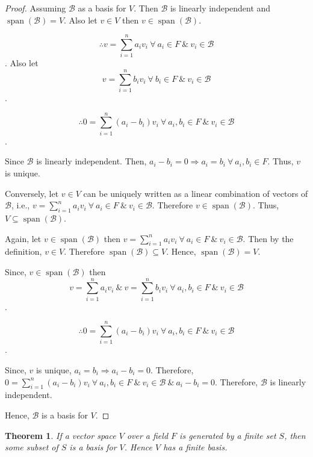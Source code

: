 \documentclass[12pt, a4paper]{article}
\newtheorem{theorem}{Theorem}[section]
\theoremstyle{definition}
\theoremstyle{remark}
\newcommand{\B}{\mathscr{B}}
\DeclareMathOperator{\Span}{span}
\begin{document}
\begin{proof}
    Assuming $\B$ as a basis for $V$. Then $\B$ is linearly independent and $\Span(\B) = V$. Also let $v \in V$ then $v \in \Span(\B)$.

$$\therefore v = \sum_{i=1}^{n} a_i v_i \ \forall \ a_i \in F \ \& \ v_i \in \B$$. Also let $$v = \sum_{i=1}^{n} b_i v_i \ \forall \ b_i \in F \ \& \ v_i \in \B$$.

$$\therefore 0 = \sum_{i=1}^{n} (a_i - b_i) v_i \ \forall \ a_i, b_i \in F \ \& \ v_i \in \B$$.

Since $\B$ is linearly independent. Then, $a_i - b_i = 0 \Rightarrow a_i = b_i \ \forall \ a_i, b_i \in F$. Thus, $v$ is unique.

Conversely, let $v \in V$ can be uniquely written as a linear combination of vectors of $\B$, i.e., $v = \displaystyle\sum_{i=1}^{n} a_i v_i \ \forall \ a_i \in F \ \& \ v_i \in \B$. Therefore $v \in \Span(\B)$. Thus, $V \subseteq \Span(\B)$.

Again, let $v \in \Span(\B)$ then $v = \displaystyle\sum_{i=1}^{n} a_i v_i \ \forall \ a_i \in F \ \& \ v_i \in \B$.
Then by the definition, $v \in V$. Therefore $\Span(\B) \subseteq V$. Hence, $\Span(\B) = V$.

Since, $v \in \Span(\B)$ then $$v = \sum_{i=1}^{n} a_i v_i \ \& \ v = \sum_{i=1}^{n} b_i v_i \ \forall \ a_i, b_i \in F \ \& \ v_i \in \B$$.

$$\therefore 0 = \sum_{i=1}^{n} (a_i - b_i) v_i \ \forall \ a_i, b_i \in F \ \& \ v_i \in \B$$.

Since, $v$ is unique, $a_i = b_i \Rightarrow a_i - b_i = 0$. Therefore, $0 = \displaystyle\sum_{i=1}^{n} (a_i - b_i) v_i \ \forall \ a_i, b_i \in F \ \& \ v_i \in \B \ \& \ a_i - b_i = 0$. Therefore, $\B$ is linearly independent.

Hence, $\B$ is a basis for $V$.
\end{proof}

\begin{theorem}
    If a vector space $V$ over a field $F$ is generated by a finite set $S$, then some subset of $S$ is a basis for $V$. Hence $V$ has a finite basis.
\end{theorem}
\end{document}
